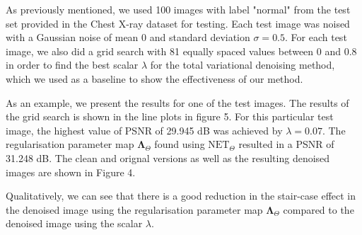 \documentclass[12pt]{article}
\begin{document}

As previously mentioned, we used 100 images with label "normal" from the test set provided in the Chest X-ray dataset for testing.
Each test image was noised with a Gaussian noise of mean 0 and standard deviation $\sigma = 0.5$.
For each test image, we also did a grid search with 81 equally spaced values between 0 and 0.8 in order to find the best scalar $\lambda$ for the total variational denoising method, which we used as a baseline to show the effectiveness of our method.


As an example, we present the results for one of the test images.
The results of the grid search is shown in the line plots in figure 5.
For this particular test image, the highest value of PSNR of 29.945 dB was achieved by $\lambda = 0.07$.
The regularisation parameter map $\mathbf{\Lambda}_\Theta$ found using $\text{NET}_{\Theta}$ resulted in a PSNR of 31.248 dB.
The clean and orignal versions as well as the resulting denoised images are shown in Figure 4.



Qualitatively, we can see that there is a good reduction in the stair-case effect in the denoised image using the regularisation parameter map $\mathbf{\Lambda}_\Theta$ compared to the denoised image using the scalar $\lambda$.

\end{document}
